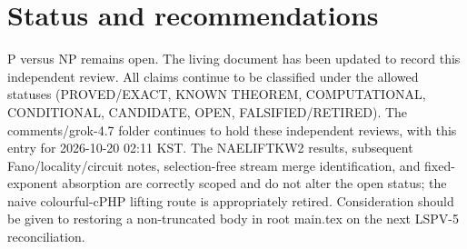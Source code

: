 \documentclass[11pt]{article}
\begin{document}
\section{Status and recommendations}
P versus NP remains open. The living document has been updated to record this independent review. All claims continue to be classified under the allowed statuses (PROVED/EXACT, KNOWN THEOREM, COMPUTATIONAL, CONDITIONAL, CANDIDATE, OPEN, FALSIFIED/RETIRED). The comments/grok-4.7 folder continues to hold these independent reviews, with this entry for 2026-10-20 02:11 KST. The NAELIFTKW2 results, subsequent Fano/locality/circuit notes, selection-free stream merge identification, and fixed-exponent absorption are correctly scoped and do not alter the open status; the naive colourful-cPHP lifting route is appropriately retired. Consideration should be given to restoring a non-truncated body in root main.tex on the next LSPV-5 reconciliation.

\end{document}
